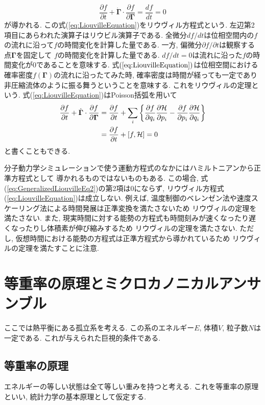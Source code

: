 \begin{equation}
 \frac{\partial f}{\partial t} + \dot{\bm{\Gamma}} \cdot \frac{\partial f}{\partial \bm{\Gamma}}
=\frac{d f}{dt}
=0
 \label{eq:LiouvilleEquation}
\end{equation}
が導かれる. この式(\ref{eq:LiouvilleEquation})をリウヴィル方程式という.
左辺第2項目にあらわれた演算子はリウビル演算子である.
全微分$df/dt$は位相空間内の$f$の流れに沿って$f$の時間変化を計算した量である.
一方, 偏微分$\partial f/\partial t$は観察する点$\bm{\Gamma}$を固定して
$f$の時間変化を計算した量である.
$df/dt=0$は流れに沿った$f$の時間変化が0であることを意味する.
式$(\ref{eq:LiouvilleEquation})$は位相空間における確率密度$f(\bm{\Gamma})$の流れに沿ったてみた時,
確率密度は時間が経っても一定であり非圧縮流体のように振る舞うということを意味する.
これをリウヴィルの定理という.
式(\ref{eq:LiouvilleEquation})はPoisson括弧を用いて
\begin{align}
  \frac{\partial f}{\partial t}
 +\dot{\bm{\Gamma}} \cdot \frac{\partial f}{\partial \bm{\Gamma}}
&=\frac{\partial f}{\partial t}
 +\sum_{i}
  \left\{
         \frac{\partial f}{\partial q_{i}} \frac{\partial \mathcal{H}}{\partial p_{i}}
        -\frac{\partial f}{\partial p_{i}} \frac{\partial \mathcal{H}}{\partial q_{i}}                     \right\}
 \notag
 \\
 &=\frac{\partial f}{\partial t} + \left[f, \mathcal{H} \right]
  = 0
\end{align}
と書くこともできる.

分子動力学シミュレーションで使う運動方程式のなかにはハミルトニアンから正準方程式として
導かれるものではないものもある.
この場合, 式(\ref{eq:GeneralizedLiouvilleEq2})の第2項は0にならず,
リウヴィル方程式(\ref{eq:LiouvilleEquation})は成立しない.
例えば, 温度制御のベレンゼン法や速度スケーリング法による時間発展は正準変換を満たさないため
リウヴィルの定理を満たさない.
また, 現実時間に対する能勢の方程式も時間刻みが速くなったり遅くなったりし体積素が伸び縮みするため
リウヴィルの定理を満たさない. ただし, 仮想時間における能勢の方程式は正準方程式から導かれているため
リウヴィルの定理を満たすことに注意.


\section{等重率の原理とミクロカノニカルアンサンブル}
ここでは熱平衡にある孤立系を考える.
この系のエネルギー$E$, 体積$V$, 粒子数$N$は一定である.
これが与えられた巨視的条件である.

\subsection{等重率の原理}
エネルギーの等しい状態は全て等しい重みを持つと考える.
これを等重率の原理といい, 統計力学の基本原理として仮定する.

